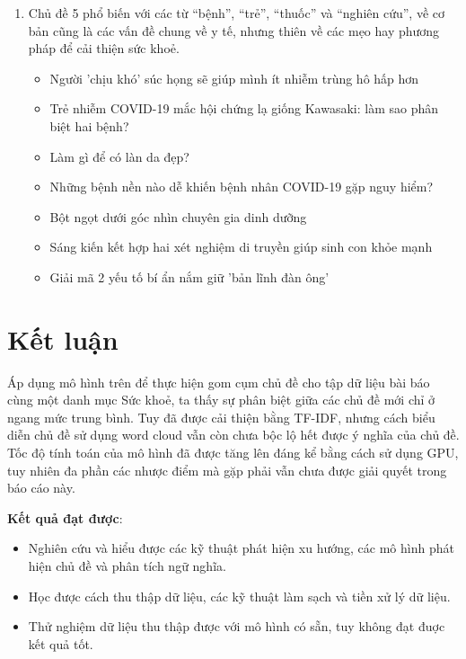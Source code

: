 \begin{enumerate}
    \item Chủ đề 5 phổ biến với các từ ``bệnh'', ``trẻ'', ``thuốc'' và ``nghiên cứu'',
        về cơ bản cũng là các vấn đề chung về y tế, nhưng thiên về các mẹo hay phương pháp để cải thiện sức khoẻ.
        \begin{itemize}
            \item Người 'chịu khó' súc họng sẽ giúp mình ít nhiễm trùng hô hấp hơn
            \item Trẻ nhiễm COVID-19 mắc hội chứng lạ giống Kawasaki: làm sao phân biệt hai bệnh?
            \item Làm gì để có làn da đẹp?
            \item Những bệnh nền nào dễ khiến bệnh nhân COVID-19 gặp nguy hiểm?
            \item Bột ngọt dưới góc nhìn chuyên gia dinh dưỡng
            \item Sáng kiến kết hợp hai xét nghiệm di truyền giúp sinh con khỏe mạnh
            \item Giải mã 2 yếu tố bí ẩn nắm giữ 'bản lĩnh đàn ông'
        \end{itemize}
\end{enumerate}







\section{Kết luận}
Áp dụng mô hình trên để thực hiện gom cụm chủ đề cho tập dữ liệu bài báo cùng
một danh mục Sức khoẻ, ta thấy sự phân biệt giữa các chủ đề mới chỉ ở ngang mức
trung bình. Tuy đã được cải thiện bằng TF-IDF, nhưng cách biểu diễn chủ đề sử
dụng word cloud vẫn còn chưa bộc lộ hết được ý nghĩa của chủ đề. Tốc độ tính
toán của mô hình đã được tăng lên đáng kể bằng cách sử dụng GPU, tuy nhiên đa
phần các nhược điểm mà \cite{lamGomCumVan2021} gặp phải vẫn chưa được giải
quyết trong báo cáo này.

\textbf{Kết quả đạt được}:
\begin{itemize}
    \item Nghiên cứu và hiểu được các kỹ thuật phát hiện xu hướng, các mô hình
        phát hiện chủ đề và phân tích ngữ nghĩa.
    \item Học được cách thu thập dữ liệu, các kỹ thuật làm sạch và tiền xử lý
        dữ liệu.
    \item Thử nghiệm dữ liệu thu thập được với mô hình có sẵn, tuy không đạt
        đuợc kết quả tốt.
\end{itemize}
